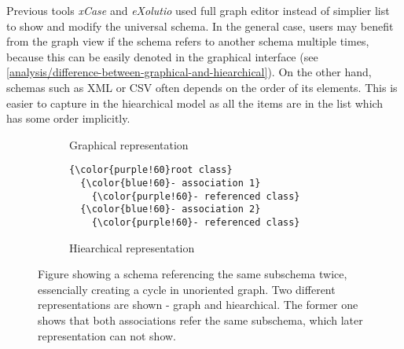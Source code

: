 Previous tools \textit{xCase} and \textit{eXolutio} used full graph editor instead of simplier list to show and modify the universal schema. In the general case, users may benefit from the graph view if the schema refers to another schema multiple times, because this can be easily denoted in the graphical interface (see \autoref{analysis/difference-between-graphical-and-hiearchical}). On the other hand, schemas such as XML or CSV often depends on the order of its elements. This is easier to capture in the hiearchical model as all the items are in the list which has some order implicitly.

\begin{figure}[h!]\centering
    \begin{subfigure}{.5\textwidth}
        \centering
        \caption{Graphical representation}
      \end{subfigure}%
      \begin{subfigure}{.5\textwidth}
\begin{Verbatim}[commandchars=\\\{\}]
{\color{purple!60}root class}
  {\color{blue!60}- association 1}
    {\color{purple!60}- referenced class}
  {\color{blue!60}- association 2}
    {\color{purple!60}- referenced class}
\end{Verbatim}
        \caption{Hiearchical representation}
      \end{subfigure}

    \caption{Figure showing a schema referencing the same subschema twice, essencially creating a cycle in unoriented graph. Two different representations are shown - graph and hiearchical.  The former one shows that both associations refer the same subschema, which later representation can not show.}
    \label{analysis/difference-between-graphical-and-hiearchical}
\end{figure}

